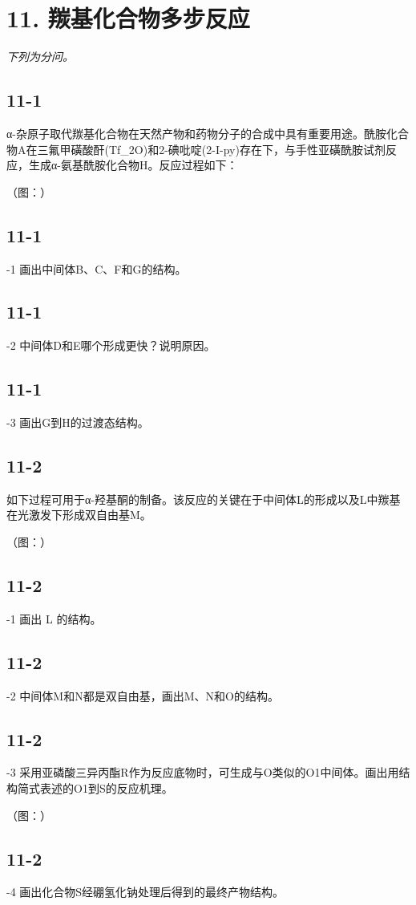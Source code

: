 \section*{11. 羰基化合物多步反应}
\textit{下列为分问。}

\subsection*{11-1}
α-杂原⼦取代羰基化合物在天然产物和药物分⼦的合成中具有重要⽤途。酰胺化合物A在三氟甲磺酸酐(Tf_{2}O)和2-碘吡啶(2-I-py)存在下，与⼿性亚磺酰胺试剂反应，⽣成α-氨基酰胺化合物H。反应过程如下：

（图：）

\subsection*{11-1}
-1 画出中间体B、C、F和G的结构。

\subsection*{11-1}
-2 中间体D和E哪个形成更快？说明原因。

\subsection*{11-1}
-3 画出G到H的过渡态结构。

\subsection*{11-2}
如下过程可⽤于α-羟基酮的制备。该反应的关键在于中间体L的形成以及L中羰基在光激发下形成双⾃由基M。

（图：）

\subsection*{11-2}
-1 画出 L 的结构。

\subsection*{11-2}
-2 中间体M和N都是双⾃由基，画出M、N和O的结构。

\subsection*{11-2}
-3 采⽤亚磷酸三异丙酯R作为反应底物时，可⽣成与O类似的O1中间体。画出⽤结构简式表述的O1到S的反应机理。

（图：）

\subsection*{11-2}
-4 画出化合物S经硼氢化钠处理后得到的最终产物结构。
